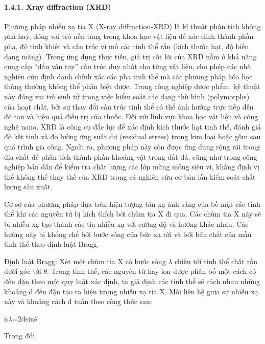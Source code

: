 \documentclass{article} %
\begin{document}
\paragraph*{1.4.1. Xray diffraction (XRD)}
\leavevmode

Phương pháp nhiễu xạ tia X (X-ray diffraction-XRD) là kĩ thuật phân tích không phá huỷ, đóng vai trò nền tảng trong khoa học vật liệu để xác định thành phần pha, độ tinh khiết và cấu trúc vi mô các tinh thể rắn (kích thước hạt, độ biến dạng màng). Trong ứng dụng thực tiễn, giá trị cốt lõi của XRD nằm ở khả năng cung cấp ``dấu vân tay'' cấu trúc duy nhất cho từng vật liệu, cho phép các nhà nghiên cứu định danh chính xác các pha tinh thể mà các phương pháp hóa học thông thường không thể phân biệt được. Trong công nghiệp dược phẩm, kỹ thuật này đóng vai trò sinh tử trong việc kiểm soát các dạng thù hình (polymorphs) của hoạt chất, bởi sự thay đổi cấu trúc tinh thể có thể ảnh hưởng trực tiếp đến độ tan và hiệu quả điều trị của thuốc. Đối với lĩnh vực khoa học vật liệu và công nghệ nano, XRD là công cụ đắc lực để xác định kích thước hạt tinh thể, đánh giá độ kết tinh và đo lường ứng suất dư (residual stress) trong kim loại hoặc gốm sau quá trình gia công. Ngoài ra, phương pháp này còn được ứng dụng rộng rãi trong địa chất để phân tích thành phần khoáng vật trong đất đá, cũng như trong công nghiệp bán dẫn để kiểm tra chất lượng các lớp màng mỏng siêu vi, khẳng định vị thế không thể thay thế của XRD trong cả nghiên cứu cơ bản lẫn kiểm soát chất lượng sản xuất. 

Cơ sở của phương pháp dựa trên hiện tượng tán xạ ánh sáng của bề mặt các tinh thể khi các nguyên tử bị kích thích bởi chùm tia X đi qua. Các chùm tia X này sẽ bị nhiễu xạ tạo thành các tia nhiễu xạ với cường độ và hướng khác nhau. Các hướng này bị khống chế bởi bước sóng của bức xạ tới và bởi bản chất của mẫu tinh thể theo định luật Bragg.

Định luật Bragg: Xét một chùm tia X có bước sóng $\lambda$ chiếu tới tinh thể chất rắn dưới góc tới $\theta$. Trong tinh thể, các nguyên tử hay ion được phân bố một cách có đều đặn theo một quy luật xác định, ta giả định các tinh thể sẽ cách nhau những khoảng d đều đặn tạo ra hiện tượng nhiễu xạ tia X. Mối liên hệ giữa sự nhiễu xạ này và khoảng cách d tuân theo công thức sau:

\begin{center}
n$\lambda$=2dsin$\theta$
\end{center}

    Trong đó:
    
\end{document}
